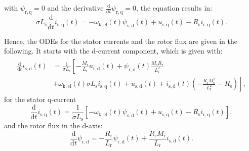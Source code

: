 \begin{solutionblock}
    with $\psi_{\mathrm{r,q}} = 0$ and the derivative $\frac{\mathrm{d}}{\mathrm{d}t}\psi_{\mathrm{r,q}} = 0$, the equation results in:
    \begin{equation}
        \sigma L_{\mathrm{s}} \frac{\mathrm{d}}{\mathrm{d}t} i_{\mathrm{s,q}}(t)
        =
        -\omega_{\mathrm{k,el}}(t)\psi_{\mathrm{s,d}}(t) + u_{\mathrm{s,q}}(t) - R_{\mathrm{s}} i_{\mathrm{r,q}}(t).
    \end{equation}

    Hence, the ODEs for the stator currents and the rotor flux are given in the following. It starts with the d-current component, which is given with:
    \begin{align}
        \begin{split}
            \frac{\mathrm{d}}{\mathrm{d}t} i_{\mathrm{s,d}}(t) &= \frac{1}{\sigma L_{\mathrm{s}}}
            \left[ 
                -\frac{M_{\mathrm{s}}}{L_{\mathrm{r}}} u_{\mathrm{r,d}}(t) + \psi_{\mathrm{r,d}}(t) \frac{M_{\mathrm{s}}R_{\mathrm{r}}}{L_{\mathrm{r}}^{2}} \right.\\
                &+ \left. \omega_{\mathrm{k,el}}(t) \sigma L_{\mathrm{s}} i_{\mathrm{s,q}}(t) + u_{\mathrm{s,d}}(t) + i_{\mathrm{s,d}}(t) \left(-\frac{R_{\mathrm{r}}M_{\mathrm{s}}^2}{L_{\mathrm{r}}^2} - R_{\mathrm{s}} \right)
            \right],
        \end{split}
    \end{align}
    for the stator q-current
    \begin{equation}
        \frac{\mathrm{d}}{\mathrm{d}t} i_{\mathrm{s,q}}(t) = \frac{1}{\sigma L_{\mathrm{s}}}
            \left[-\omega_{\mathrm{k,el}}(t)\psi_{\mathrm{s,d}}(t) + u_{\mathrm{s,q}}(t) - R_{\mathrm{s}} i_{\mathrm{r,q}}(t)\right],
    \end{equation}
    and the rotor flux in the d-axis:
    \begin{equation}
        \frac{\mathrm{d}}{\mathrm{d}t}\psi_{\mathrm{r,d}} = - \frac{R_{\mathrm{r}}}{L_{\mathrm{r}}} \psi_{\mathrm{r,d}}(t) + \frac{R_{\mathrm{r}}M_{\mathrm{r}}}{L_{\mathrm{r}}}i_{\mathrm{s,d}}(t).
    \end{equation}


\end{solutionblock}
